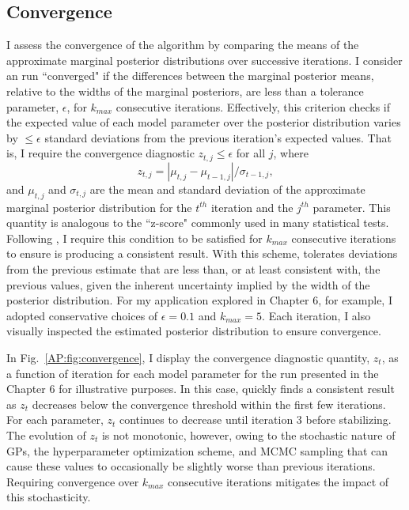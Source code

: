 \subsection{Convergence} \label{AP:sec:app:convergence}

I assess the convergence of the \approxposterior algorithm by comparing the means of the approximate marginal posterior distributions over successive iterations. I consider an \approxposterior run ``converged" if the differences between the marginal posterior means, relative to the widths of the marginal posteriors, are less than a tolerance parameter, $\epsilon$, for $k_{max}$ consecutive iterations. Effectively, this criterion checks if the expected value of each model parameter over the posterior distribution varies by ${\leq}{\epsilon}$ standard deviations from the previous iteration's expected values. That is, I require the \approxposterior convergence diagnostic $z_{t,j}{\leq}{\epsilon}$ for all $j$, where
\begin{equation}
    z_{t,j} = |\mu_{t,j} - \mu_{t-1,j}| / \sigma_{t-1,j},
\end{equation}
 and $\mu_{t,j}$ and $\sigma_{t,j}$ are the mean and standard deviation of the approximate marginal posterior distribution for the $t^{th}$ iteration and the $j^{th}$ parameter. This quantity is analogous to the ``z-score" commonly used in many statistical tests. Following \citet{Wang2018}, I require this condition to be satisfied for $k_{max}$ consecutive iterations to ensure \approxposterior is producing a consistent result. With this scheme, \approxposterior tolerates deviations from the previous estimate that are less than, or at least consistent with, the previous values, given the inherent uncertainty implied by the width of the posterior distribution. For my application explored in Chapter 6, for example, I adopted conservative choices of $\epsilon = 0.1$ and $k_{max} = 5$. Each \approxposterior iteration, I also visually inspected the estimated posterior distribution to ensure convergence. 

In Fig.~\ref{AP:fig:convergence}, I display the convergence diagnostic quantity, $z_t$, as a function of iteration for each model parameter for the \approxposterior run presented in the Chapter 6 for illustrative purposes. In this case, \approxposterior quickly finds a consistent result as $z_t$ decreases below the convergence threshold within the first few iterations. For each parameter, $z_t$ continues to decrease until iteration 3 before stabilizing. The evolution of $z_t$ is not monotonic, however, owing to the stochastic nature of GPs, the hyperparameter optimization scheme, and MCMC sampling that can cause these values to occasionally be slightly worse than previous iterations. Requiring convergence over $k_{max}$ consecutive iterations mitigates the impact of this stochasticity.

